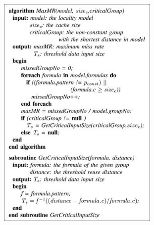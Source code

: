 \documentclass[12pt]{article}
\begin{document}

\begin{figure}[H]
\advance\leftskip 0.02in		\includegraphics[width=3.55in,height=4.57in]{./media/image4.jpeg}
\end{figure}



\par


\vspace{\baselineskip}

\vspace{\baselineskip}

\vspace{\baselineskip}

\vspace{\baselineskip}

\vspace{\baselineskip}

\vspace{\baselineskip}

\vspace{\baselineskip}

\vspace{\baselineskip}

\vspace{\baselineskip}

\vspace{\baselineskip}
\end{document}
